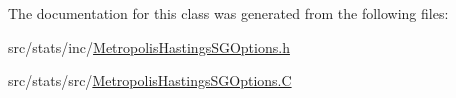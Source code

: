 The documentation for this class was generated from the following files\-:\begin{DoxyCompactItemize}
\item 
src/stats/inc/\hyperlink{_metropolis_hastings_s_g_options_8h}{Metropolis\-Hastings\-S\-G\-Options.\-h}\item 
src/stats/src/\hyperlink{_metropolis_hastings_s_g_options_8_c}{Metropolis\-Hastings\-S\-G\-Options.\-C}\end{DoxyCompactItemize}
